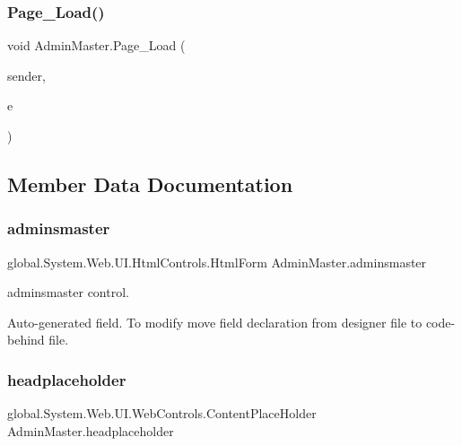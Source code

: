 \mbox{\label{class_admin_master_ae919928c9e43d5f5ab5d006afca88d6b}} 
\subsubsection{\texorpdfstring{Page\_Load()}{Page\_Load()}}
{\footnotesize\ttfamily void Admin\+Master.\+Page\+\_\+\+Load (\begin{DoxyParamCaption}\item[{object}]{sender,  }\item[{Event\+Args}]{e }\end{DoxyParamCaption})\hspace{0.3cm}{\ttfamily [protected]}}



\subsection{Member Data Documentation}
\mbox{\label{class_admin_master_a7a0a68bcef19e4ad48d5ce115625bcb3}} 
\subsubsection{\texorpdfstring{adminsmaster}{adminsmaster}}
{\footnotesize\ttfamily global.\+System.\+Web.\+U\+I.\+Html\+Controls.\+Html\+Form Admin\+Master.\+adminsmaster\hspace{0.3cm}{\ttfamily [protected]}}



adminsmaster control. 

Auto-\/generated field. To modify move field declaration from designer file to code-\/behind file. \mbox{\label{class_admin_master_a0336b034c5bd3fdcac6e741a0dd46d3e}} 
\subsubsection{\texorpdfstring{headplaceholder}{headplaceholder}}
{\footnotesize\ttfamily global.\+System.\+Web.\+U\+I.\+Web\+Controls.\+Content\+Place\+Holder Admin\+Master.\+headplaceholder\hspace{0.3cm}{\ttfamily [protected]}}



